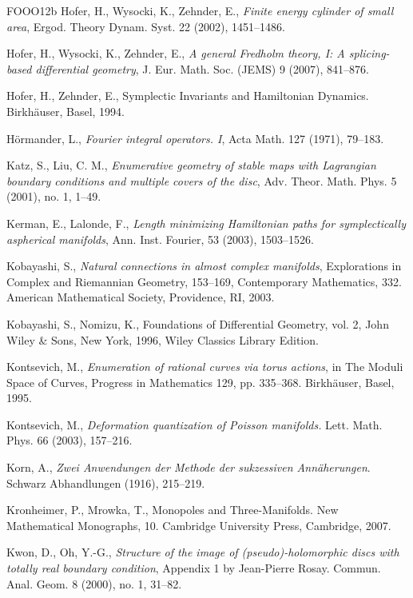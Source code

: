 \begin{thebibliography}{FOOO12b}
 Hofer, H., Wysocki, K., Zehnder, E., \emph{Finite energy cylinder of small area},
  Ergod. Theory Dynam. Syst. 22 (2002), 1451–1486.

 Hofer, H., Wysocki, K., Zehnder, E., \emph{A general Fredholm theory, I: A
  splicing-based diﬀerential geometry}, J. Eur. Math. Soc. (JEMS) 9 (2007), 841–876.

 Hofer, H., Zehnder, E., Symplectic Invariants and Hamiltonian Dynam\-ics.
  Birkhäuser, Basel, 1994.

 Hörmander, L., \emph{Fourier integral operators. I}, Acta Math. 127 (1971),
  79–183.

 Katz, S., Liu, C. M., \emph{Enumerative geometry of stable maps with Lagrangian
  boundary conditions and multiple covers of the disc}, Adv. Theor. Math. Phys. 5 (2001), no. 1, 1–49.

 Kerman, E., Lalonde, F., \emph{Length minimizing Hamiltonian paths for
  symplectically aspherical manifolds}, Ann. Inst. Fourier, 53 (2003), 1503–1526.

 Kobayashi, S., \emph{Natural connections in almost complex manifolds},
  Explo\-rations in Complex and Riemannian Geometry, 153–169, Contemporary Mathematics, 332. American
  Mathematical Society, Providence, RI, 2003.

 Kobayashi, S., Nomizu, K., Foundations of Diﬀerential Geometry, vol. 2, John Wiley
  \& Sons, New York, 1996, Wiley Classics Library Edition.

 Kontsevich, M., \emph{Enumeration of rational curves via torus actions}, in The
  Moduli Space of Curves, Progress in Mathematics 129, pp. 335–368. Birkhäuser, Basel, 1995.

 Kontsevich, M., \emph{Deformation quantization of Poisson manifolds.} Lett. Math.
  Phys. 66 (2003), 157–216.

 Korn, A., \emph{Zwei Anwendungen der Methode der sukzessiven Annäherun\-gen}.
  Schwarz Abhandlungen (1916), 215–219.

 Kronheimer, P., Mrowka, T., Monopoles and Three-Manifolds. New Mathematical
  Monographs, 10. Cambridge University Press, Cambridge, 2007.

 Kwon, D., Oh, Y.-G., \emph{Structure of the image of (pseudo)-holomorphic discs with
  totally real boundary condition}, Appendix 1 by Jean-Pierre Rosay. Commun. Anal. Geom. 8 (2000), no. 1,
  31–82.


\end{thebibliography}
